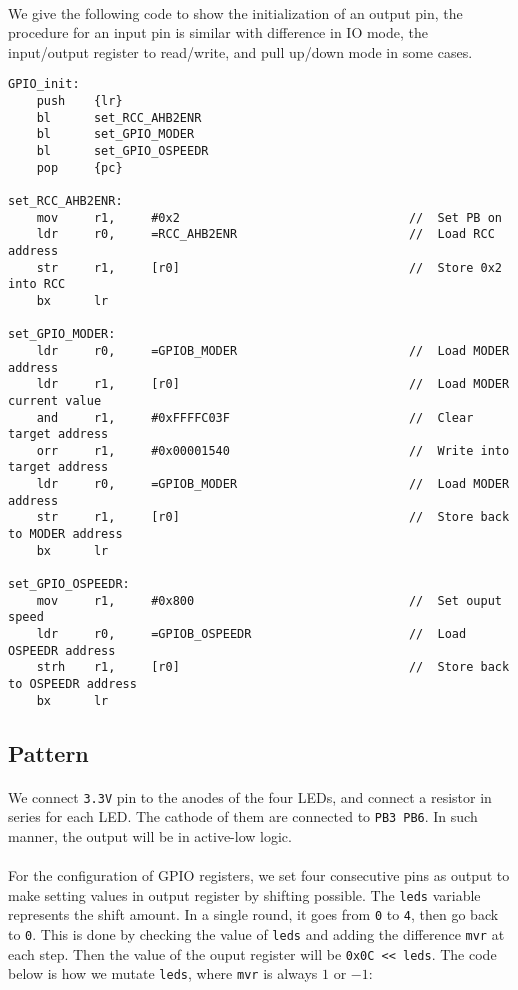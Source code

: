 \paragraph{}
We give the following code to show the initialization of an output pin,
the procedure for an input pin is similar with difference in IO mode, the input/output register to read/write,
and pull up/down mode in some cases.
\begin{lstlisting}
GPIO_init:
    push    {lr}
    bl      set_RCC_AHB2ENR
    bl      set_GPIO_MODER
    bl      set_GPIO_OSPEEDR
    pop     {pc}

set_RCC_AHB2ENR:
    mov     r1,     #0x2                                //  Set PB on
    ldr     r0,     =RCC_AHB2ENR                        //  Load RCC address
    str     r1,     [r0]                                //  Store 0x2 into RCC
    bx      lr  

set_GPIO_MODER:
    ldr     r0,     =GPIOB_MODER                        //  Load MODER address
    ldr     r1,     [r0]                                //  Load MODER current value
    and     r1,     #0xFFFFC03F                         //  Clear target address
    orr     r1,     #0x00001540                         //  Write into target address
    ldr     r0,     =GPIOB_MODER                        //  Load MODER address
    str     r1,     [r0]                                //  Store back to MODER address
    bx      lr  

set_GPIO_OSPEEDR:
    mov     r1,     #0x800                              //  Set ouput speed
    ldr     r0,     =GPIOB_OSPEEDR                      //  Load OSPEEDR address
    strh    r1,     [r0]                                //  Store back to OSPEEDR address
    bx      lr  
\end{lstlisting}

\subsection{Pattern}
\paragraph{}
We connect \texttt{3.3V} pin to the anodes of the four LEDs, and connect a resistor in series for each LED. 
The cathode of them are connected to \texttt{PB3}~\texttt{PB6}.
In such manner, the output will be in active-low logic.

\paragraph{}
For the configuration of GPIO registers,
we set four consecutive pins as output to make setting values in output register by shifting possible.
The \texttt{leds} variable represents the shift amount.
In a single round, it goes from \texttt{0} to \texttt{4}, then go back to \texttt{0}.
This is done by checking the value of \texttt{leds} and adding the difference \texttt{mvr} at each step.
Then the value of the ouput register will be \texttt{0x0C << leds}.
The code below is how we mutate \texttt{leds}, where \texttt{mvr} is always $1$ or $-1$:

